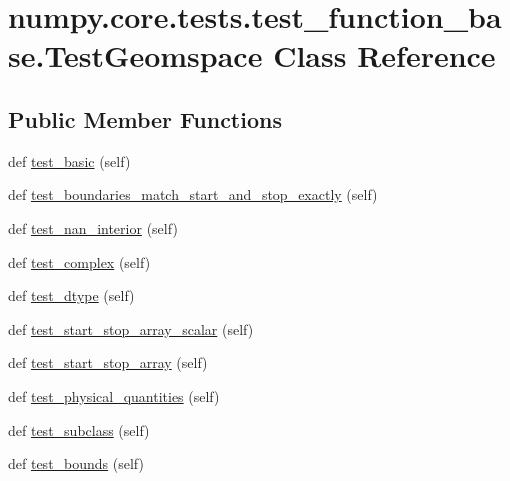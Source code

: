 \hypertarget{classnumpy_1_1core_1_1tests_1_1test__function__base_1_1TestGeomspace}{}\section{numpy.\+core.\+tests.\+test\+\_\+function\+\_\+base.\+Test\+Geomspace Class Reference}
\label{classnumpy_1_1core_1_1tests_1_1test__function__base_1_1TestGeomspace}
\subsection*{Public Member Functions}
\begin{DoxyCompactItemize}
\item 
def \hyperlink{classnumpy_1_1core_1_1tests_1_1test__function__base_1_1TestGeomspace_a40b187fd16d82e5f4ef4c3ff52eaadbb}{test\+\_\+basic} (self)
\item 
def \hyperlink{classnumpy_1_1core_1_1tests_1_1test__function__base_1_1TestGeomspace_af92a866bfd06d71541a60568f19c744e}{test\+\_\+boundaries\+\_\+match\+\_\+start\+\_\+and\+\_\+stop\+\_\+exactly} (self)
\item 
def \hyperlink{classnumpy_1_1core_1_1tests_1_1test__function__base_1_1TestGeomspace_a983456ddc286b73c742ac0adce2eb86c}{test\+\_\+nan\+\_\+interior} (self)
\item 
def \hyperlink{classnumpy_1_1core_1_1tests_1_1test__function__base_1_1TestGeomspace_a670878e32dc9934bd135a9660eab6db6}{test\+\_\+complex} (self)
\item 
def \hyperlink{classnumpy_1_1core_1_1tests_1_1test__function__base_1_1TestGeomspace_abc46c7cece6d71527321a83b31b9e02c}{test\+\_\+dtype} (self)
\item 
def \hyperlink{classnumpy_1_1core_1_1tests_1_1test__function__base_1_1TestGeomspace_aabd5c8ff0e80bd1277a7e2e30b533c6d}{test\+\_\+start\+\_\+stop\+\_\+array\+\_\+scalar} (self)
\item 
def \hyperlink{classnumpy_1_1core_1_1tests_1_1test__function__base_1_1TestGeomspace_a8a5aae336af05b82a0fd9dd75ea1cc2a}{test\+\_\+start\+\_\+stop\+\_\+array} (self)
\item 
def \hyperlink{classnumpy_1_1core_1_1tests_1_1test__function__base_1_1TestGeomspace_ac43b34d535f1d0e7c30e5bf42c962d17}{test\+\_\+physical\+\_\+quantities} (self)
\item 
def \hyperlink{classnumpy_1_1core_1_1tests_1_1test__function__base_1_1TestGeomspace_af038960074008512f12f544a35cfa7c6}{test\+\_\+subclass} (self)
\item 
def \hyperlink{classnumpy_1_1core_1_1tests_1_1test__function__base_1_1TestGeomspace_a3b133dca1543f410d8f64d736c2c7e77}{test\+\_\+bounds} (self)
\end{DoxyCompactItemize}


